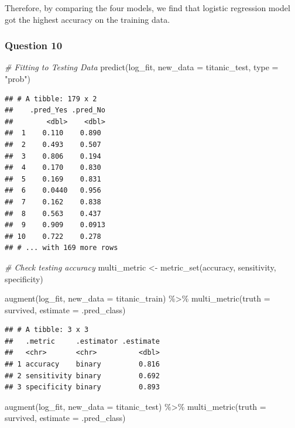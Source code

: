 \documentclass[
]{article}
\newenvironment{Shaded}{\begin{snugshade}}{\end{snugshade}}
\newcommand{\AttributeTok}[1]{\textcolor[rgb]{0.77,0.63,0.00}{#1}}
\newcommand{\CommentTok}[1]{\textcolor[rgb]{0.56,0.35,0.01}{\textit{#1}}}
\newcommand{\FunctionTok}[1]{\textcolor[rgb]{0.00,0.00,0.00}{#1}}
\newcommand{\NormalTok}[1]{#1}
\newcommand{\OtherTok}[1]{\textcolor[rgb]{0.56,0.35,0.01}{#1}}
\newcommand{\SpecialCharTok}[1]{\textcolor[rgb]{0.00,0.00,0.00}{#1}}
\newcommand{\StringTok}[1]{\textcolor[rgb]{0.31,0.60,0.02}{#1}}
\begin{document}
Therefore, by comparing the four models, we find that logistic
regression model got the highest accuracy on the training data.

\hypertarget{question-10}{%
\subsubsection{Question 10}\label{question-10}}

\begin{Shaded}
\begin{Highlighting}[]
\CommentTok{\# Fitting to Testing Data}
\FunctionTok{predict}\NormalTok{(log\_fit, }\AttributeTok{new\_data =}\NormalTok{ titanic\_test, }\AttributeTok{type =} \StringTok{"prob"}\NormalTok{)}
\end{Highlighting}
\end{Shaded}

\begin{verbatim}
## # A tibble: 179 x 2
##    .pred_Yes .pred_No
##        <dbl>    <dbl>
##  1    0.110    0.890 
##  2    0.493    0.507 
##  3    0.806    0.194 
##  4    0.170    0.830 
##  5    0.169    0.831 
##  6    0.0440   0.956 
##  7    0.162    0.838 
##  8    0.563    0.437 
##  9    0.909    0.0913
## 10    0.722    0.278 
## # ... with 169 more rows
\end{verbatim}

\begin{Shaded}
\begin{Highlighting}[]
\CommentTok{\# Check testing accuracy}
\NormalTok{multi\_metric }\OtherTok{\textless{}{-}} \FunctionTok{metric\_set}\NormalTok{(accuracy, sensitivity, specificity)}

\FunctionTok{augment}\NormalTok{(log\_fit, }\AttributeTok{new\_data =}\NormalTok{ titanic\_train) }\SpecialCharTok{\%\textgreater{}\%}
  \FunctionTok{multi\_metric}\NormalTok{(}\AttributeTok{truth =}\NormalTok{ survived, }\AttributeTok{estimate =}\NormalTok{ .pred\_class)}
\end{Highlighting}
\end{Shaded}

\begin{verbatim}
## # A tibble: 3 x 3
##   .metric     .estimator .estimate
##   <chr>       <chr>          <dbl>
## 1 accuracy    binary         0.816
## 2 sensitivity binary         0.692
## 3 specificity binary         0.893
\end{verbatim}

\begin{Shaded}
\begin{Highlighting}[]
\FunctionTok{augment}\NormalTok{(log\_fit, }\AttributeTok{new\_data =}\NormalTok{ titanic\_test) }\SpecialCharTok{\%\textgreater{}\%}
  \FunctionTok{multi\_metric}\NormalTok{(}\AttributeTok{truth =}\NormalTok{ survived, }\AttributeTok{estimate =}\NormalTok{ .pred\_class)}
\end{Highlighting}
\end{Shaded}
\end{document}
